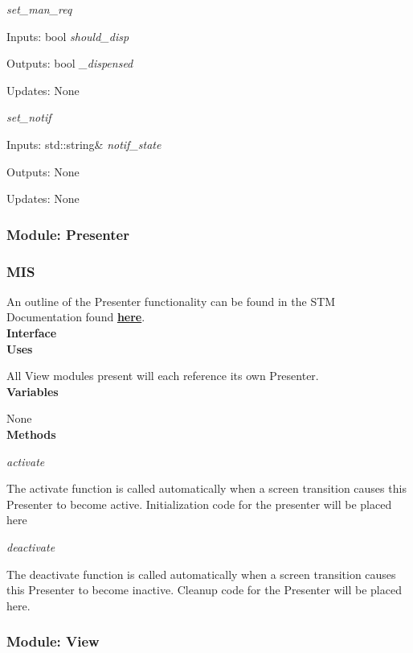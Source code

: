 \documentclass[12pt,titlepage]{article}
\begin{document}
\textit{set\_man\_req} \par
Inputs: bool \textit{should\_disp} \par
Outputs: bool \textit{\_dispensed} \par
Updates: None \newline

\textit{set\_notif} \par
Inputs: std::string& \textit{notif\_state} \par
Outputs: None \par
Updates: None \newline


\subsubsection{Module: Presenter}
\subsubsection*{MIS}

\noindent An outline of the Presenter functionality can be found in the STM Documentation found \textbf{\href{https://support.touchgfx.com/docs/development/ui-development/software-architecture/screen-definition-and-mvp/#model}{here}}. \\

\noindent \textbf{Interface} \\

\noindent \textbf{Uses}

\noindent All View modules present will each reference its own Presenter. \\

\noindent \textbf{Variables}

\noindent None \\

\noindent \textbf{Methods}

\textit{activate} \par
The activate function is called automatically when a screen transition causes this Presenter to become active. Initialization code for the presenter will be placed here

\textit{deactivate} \par
The deactivate function is called automatically when a screen transition causes this Presenter to become inactive. Cleanup code for the Presenter will be placed here.

\subsubsection{Module: View}
\end{document}
